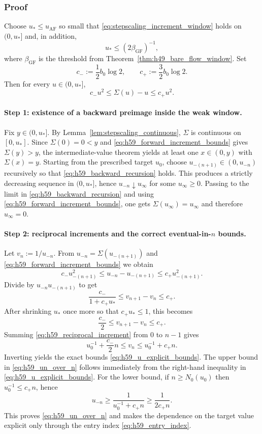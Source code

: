 \subsubsection{Proof}
Choose $u_\ast\le u_{\mathrm{AF}}$ so small that \eqref{eq:stepscaling_increment_window} holds on $(0,u_\ast]$ and, in addition,
\[
 u_\ast\le (2\beta_{\mathrm{GF}})^{-1},
\]
where $\beta_{\mathrm{GF}}$ is the threshold from Theorem~\ref{thm:h49_bare_flow_window}.
Set
\[
 c_-:=\frac12 b_0\log 2,
 \qquad
 c_+:=\frac32 b_0\log 2.
\]
Then for every $u\in(0,u_\ast]$,
\begin{equation}
\label{eq:h59_forward_increment_bounds}
 c_-u^2\le \Sigma(u)-u\le c_+u^2.
\end{equation}

\paragraph{Step 1: existence of a backward preimage inside the weak window.}
Fix $y\in(0,u_\ast]$.
By Lemma~\ref{lem:stepscaling_continuous}, $\Sigma$ is continuous on $[0,u_\ast]$.
Since $\Sigma(0)=0<y$ and \eqref{eq:h59_forward_increment_bounds} gives $\Sigma(y)>y$, the intermediate-value theorem yields at least one $x\in(0,y)$ with $\Sigma(x)=y$.
Starting from the prescribed target $u_0$, choose $u_{-(n+1)}\in(0,u_{-n})$ recursively so that \eqref{eq:h59_backward_recursion} holds.
This produces a strictly decreasing sequence in $(0,u_\ast]$, hence $u_{-n}\downarrow u_\infty$ for some $u_\infty\ge 0$.
Passing to the limit in \eqref{eq:h59_backward_recursion} and using \eqref{eq:h59_forward_increment_bounds}, one gets $\Sigma(u_\infty)=u_\infty$ and therefore $u_\infty=0$.

\paragraph{Step 2: reciprocal increments and the correct eventual-in-$n$ bounds.}
Let $v_n:=1/u_{-n}$.
From $u_{-n}=\Sigma(u_{-(n+1)})$ and \eqref{eq:h59_forward_increment_bounds} we obtain
\[
 c_-u_{-(n+1)}^2\le u_{-n}-u_{-(n+1)}\le c_+u_{-(n+1)}^2.
\]
Divide by $u_{-n}u_{-(n+1)}$ to get
\[
 \frac{c_-}{1+c_+u_\ast}
 \le
 v_{n+1}-v_n
 \le
 c_+.
\]
After shrinking $u_\ast$ once more so that $c_+u_\ast\le1$, this becomes
\begin{equation}
\label{eq:h59_reciprocal_increment}
 \frac{c_-}{2}
 \le
 v_{n+1}-v_n
 \le
 c_+.
\end{equation}
Summing \eqref{eq:h59_reciprocal_increment} from $0$ to $n-1$ gives
\[
 u_0^{-1}+\frac{c_-}{2}n\le v_n\le u_0^{-1}+c_+n.
\]
Inverting yields the exact bounds \eqref{eq:h59_u_explicit_bounds}.
The upper bound in \eqref{eq:h59_un_over_n} follows immediately from the right-hand inequality in \eqref{eq:h59_u_explicit_bounds}.
For the lower bound, if $n\ge N_0(u_0)$ then $u_0^{-1}\le c_+n$, hence
\[
 u_{-n}\ge \frac{1}{u_0^{-1}+c_+n}\ge \frac{1}{2c_+n}.
\]
This proves \eqref{eq:h59_un_over_n} and makes the dependence on the target value explicit only through the entry index \eqref{eq:h59_entry_index}.

